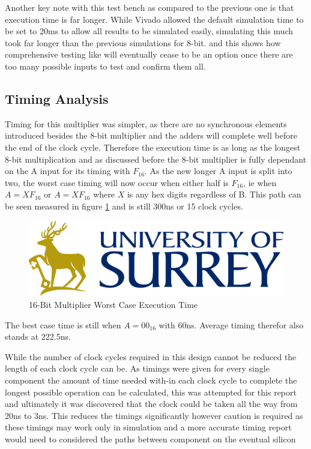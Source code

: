 \documentclass[11pt]{article}
\begin{document}
Another key note with this test bench as compared to the previous one is that execution time is far longer.
While Vivado allowed  the default simulation time to be set to 20ms to allow all results to be simulated easily, 
simulating this much took far longer than the previous simulations for 8-bit. 
and this shows how comprehensive testing like will eventually cease to be an option once there are too many possible inputs to test and confirm them all.

\subsection{Timing Analysis}
Timing for this multiplier was simpler, as there are no synchronous elements introduced besides the 8-bit multiplier and the adders will complete well before the end of the clock cycle.
Therefore the execution time is as long as the longest 8-bit multiplication and as discussed before the 8-bit multiplier is fully dependant on the A input for its timing with $F_{16}$.
As the new longer A input is split into two, the worst case timing will now occur when either half is $F_{16}$, ie when $A = XF_{16}$ or $A = XF_{16}$ where $X$ is any hex digits regardless of B.
This path can be seen measured in figure \ref{fig:8bit_worst} and is still 300ns or 15 clock cycles.

\begin{figure}[H]         
    \centering
    \includegraphics[width=\textwidth]{Logo.png}
    \caption{16-Bit Multiplier Worst Case Execution Time}
    \label{fig:8bit_worst}
\end{figure} 

The best case time is still when $A=00_{16}$ with 60ns.
Average timing therefor also stands at 222.5ns.

While the number of clock cycles required in this design cannot be reduced the length of each clock cycle can be.
As timings were given for every single component the amount of time needed with-in each clock cycle to complete the longest possible operation can be calculated,
this was attempted for this report and ultimately it was discovered that the clock could be taken all the way from 20ns to 3ns.
This reduces the timings significantly however caution is required as these timings may work only in simulation and a more accurate timing report would need to considered the paths between component on the eventual silicon
\end{document}
